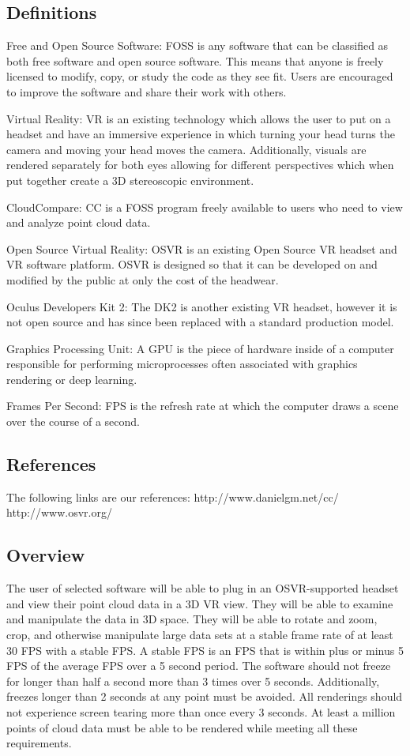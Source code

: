 \documentclass{article}
\begin{document}
\subsection{Definitions}

Free and Open Source Software: FOSS is any software that can be classified as both free software and open source software. This means that anyone is freely licensed to modify, copy, or study the code as they see fit. 
Users are encouraged to improve the software and share their work with others.

Virtual Reality: VR is an existing technology which allows the user to put on a headset and have an immersive experience in which turning your head turns the camera and moving your head moves the camera.
Additionally, visuals are rendered separately for both eyes allowing for different perspectives which when put together create a 3D stereoscopic environment.

CloudCompare: CC is a FOSS program freely available to users who need to view and analyze point cloud data.

Open Source Virtual Reality: OSVR is an existing Open Source VR headset and VR software platform. OSVR is designed so that it can be developed on and modified by the public at only the cost of the headwear.

Oculus Developers Kit 2: The DK2 is another existing VR headset, however it is not open source and has since been replaced with a standard production model.

Graphics Processing Unit: A GPU is the piece of hardware inside of a computer responsible for performing microprocesses often associated with graphics rendering or deep learning.

Frames Per Second: FPS is the refresh rate at which the computer draws a scene over the course of a second.

\subsection{References}

The following links are our references:
  http://www.danielgm.net/cc/
  http://www.osvr.org/

\subsection{Overview}

The user of selected software will be able to plug in an OSVR-supported headset and view their point cloud data in a 3D VR view.
They will be able to examine and manipulate the data in 3D space. 
They will be able to rotate and zoom, crop, and otherwise manipulate large data sets at a stable frame rate of at least 30 FPS with a stable FPS.
A stable FPS is an FPS that is within plus or minus 5 FPS of the average FPS over a 5 second period.
The software should not freeze for longer than half a second more than 3 times over 5 seconds.
Additionally, freezes longer than 2 seconds at any point must be avoided.
All renderings should not experience screen tearing more than once every 3 seconds.
At least a million points of cloud data must be able to be rendered while meeting all these requirements.
\end{document}
